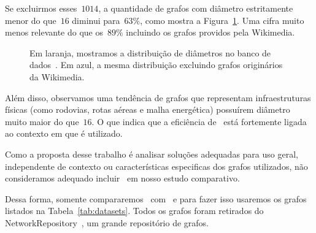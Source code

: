 Se excluirmos esses~$1014$, a quantidade de grafos com diâmetro estritamente menor do que~$16$ diminui para~$63\%$, como mostra a Figura~\ref{fig:distdiametro}.
Uma cifra muito menos relevante do que os~$89\%$ incluindo os grafos providos pela Wikimedia.

\begin{figure}
\begin{center}
\caption{Em laranja, mostramos a distribuição de diâmetros no banco de dados~\cite{KONECT}. Em azul, a mesma distribuição excluindo grafos originários da Wikimedia.}
\label{fig:distdiametro}
\end{center}
\end{figure}

Além disso, observamos uma tendência de grafos que representam infraestruturas físicas (como rodovias, rotas aéreas e malha energética) possuírem diâmetro muito maior do que~$16$.
O que indica que a eficiência de~\CLHB{} está fortemente ligada ao contexto em que é utilizado. 

Como a proposta desse trabalho é analisar soluções adequadas para uso geral, independente de contexto ou características especificas dos grafos utilizados, não consideramos adequado incluir~\CLHB{} em nosso estudo comparativo.


Dessa forma, somente compararemos~\HK{} com~\HDT{} e para fazer isso usaremos os grafos listados na Tabela~\ref{tab:datasets}.
Todos os grafos foram retirados do NetworkRepository~\cite{nr-aaai15}, um grande repositório de grafos.


